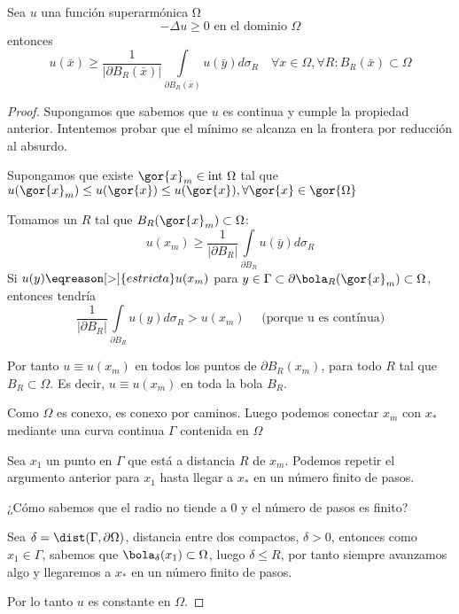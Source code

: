 		\begin{theorem} Sea $u$ una función superarmónica Ω
			\[ - \Delta u \geq 0 \text{ en el dominio } \Omega \]
			entonces
			\[ u (\bar{x}) \geq \frac{1}{|\partial B_R(\bar{x})|} \int\limits_{\partial B_R (\bar{x})} u(\bar{y}) d \sigma_R \quad \forall x \in \Omega, \forall R : B_R(\bar{x}) \subset \Omega \]

		\end{theorem}

		\begin{proof}

			Supongamos que sabemos que $u$ es continua y cumple la propiedad anterior. Intentemos probar que el mínimo se alcanza en la frontera por reducción al absurdo.

			Supongamos que existe $\gor{x}_m \in \text{int } \Omega$ tal que $u(\gor{x}_m) \leq u(\gor{x}) \leq u(\gor{x}), \forall \gor{x} \in \gor{\Omega}$

			Tomamos un $R$ tal que $B_R (\gor{x}_m) \subset \Omega$:
			\[ u(x_m) \geq \frac{1}{|\partial B_R|}  \int\limits_{\partial B_R} u(\bar{y}) d \sigma_R \]
			Si $u(y) \eqreason[>]{estricta} u(x_m)$ para $ y \in \Gamma \subset \partial \bola_R(\gor{x}_m) \subset \Omega$, entonces tendría $$\frac{1}{|\partial B_R|} \int\limits_{\partial B_R} u(y) d \sigma_R > u(x_m) \quad\text{ (porque u es contínua)}$$

			Por tanto $u \equiv u(x_m)$ en todos los puntos de $\partial B_R(x_m)$, para todo $R$ tal que $B_R \subset \Omega$. Es decir, $u \equiv u(x_m)$ en toda la bola $B_R$.

			Como $\Omega$ es conexo, es conexo por caminos. Luego podemos conectar $x_m$ con $x_*$ mediante una curva continua $\Gamma$ contenida en $\Omega$

			\begin{minipage}[t]{\linewidth}
				\centering
				\label{fig:DominioPpioMediaFuerte}
			\end{minipage}

			Sea $x_1$ un punto en $\Gamma$ que está a distancia $R$ de $x_m$. Podemos repetir el argumento anterior para $x_1$ hasta llegar a $x_*$ en un número finito de pasos.

			¿Cómo sabemos que el radio no tiende a 0 y el número de pasos es finito?

			Sea $\delta = \dist(\Gamma, \partial\Omega)$, distancia entre dos compactos, $\delta>0$,  entonces como $x_1 \in \Gamma$, sabemos que $\bola_\delta(x_1) \subset \Omega$, luego $\delta \leq R$, por tanto siempre avanzamos algo y llegaremos a $x_*$ en un número finito de pasos.

			Por lo tanto $u$ es constante en $\Omega$.
		\end{proof}

